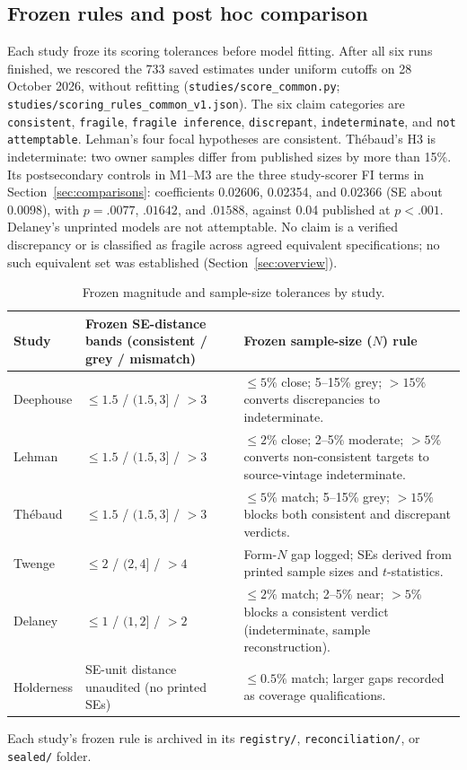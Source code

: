 \documentclass[11pt]{article}
\newcommand{\artifact}[1]{\nolinkurl{#1}}
\begin{document}
\subsection{Frozen rules and post hoc comparison}
Each study froze its scoring tolerances before model fitting. After all six runs finished, we rescored the 733 saved estimates under uniform cutoffs on 28 October 2026, without refitting (\artifact{studies/score_common.py}; \artifact{studies/scoring_rules_common_v1.json}). The six claim categories are \texttt{consistent}, \texttt{fragile}, \texttt{fragile inference}, \texttt{discrepant}, \texttt{indeterminate}, and \texttt{not attemptable}. Lehman's four focal hypotheses are consistent. Th\'ebaud's H3 is indeterminate: two owner samples differ from published sizes by more than 15\%. Its postsecondary controls in M1--M3 are the three study-scorer FI terms in Section~\ref{sec:comparisons}: coefficients 0.02606, 0.02354, and 0.02366 (SE about 0.0098), with $p=.0077$, $.01642$, and $.01588$, against 0.04 published at $p<.001$. Delaney's unprinted models are not attemptable. No claim is a verified discrepancy or is classified as fragile across agreed equivalent specifications; no such equivalent set was established (Section~\ref{sec:overview}).

\begin{table}[H]\centering\small
\begin{tabularx}{\linewidth}{@{}l p{.23\linewidth}Y@{}}\toprule
Study & Frozen SE-distance bands (consistent / grey / mismatch) & Frozen sample-size ($N$) rule\\\midrule
Deephouse & $\leq1.5$ / $(1.5,3]$ / $>3$ & $\leq5\%$ close; 5--15\% grey; $>15\%$ converts discrepancies to indeterminate.\\
Lehman & $\leq1.5$ / $(1.5,3]$ / $>3$ & $\leq2\%$ close; 2--5\% moderate; $>5\%$ converts non-consistent targets to source-vintage indeterminate.\\
Th\'ebaud & $\leq1.5$ / $(1.5,3]$ / $>3$ & $\leq5\%$ match; 5--15\% grey; $>15\%$ blocks both consistent and discrepant verdicts.\\
Twenge & $\leq2$ / $(2,4]$ / $>4$ & Form-$N$ gap logged; SEs derived from printed sample sizes and $t$-statistics.\\
Delaney & $\leq1$ / $(1,2]$ / $>2$ & $\leq2\%$ match; 2--5\% near; $>5\%$ blocks a consistent verdict (indeterminate, sample reconstruction).\\
Holderness & SE-unit distance unaudited (no printed SEs) & $\leq0.5\%$ match; larger gaps recorded as coverage qualifications.\\\bottomrule
\end{tabularx}\caption{Frozen magnitude and sample-size tolerances by study.}\end{table}
Each study's frozen rule is archived in its \artifact{registry/}, \artifact{reconciliation/}, or \artifact{sealed/} folder.
\end{document}
